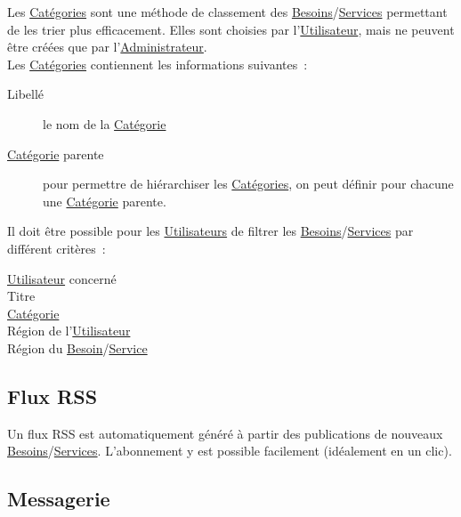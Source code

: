 \documentclass[french]{article}
\begin{document}
			Les \hyperlink{categorie}{Catégories} sont une méthode de classement des
			 \hyperlink{besoin}{Besoins}/\hyperlink{service}{Services} permettant de
			 les trier plus efficacement. Elles sont choisies par
			 l’\hyperlink{utilisateur}{Utilisateur}, mais ne peuvent être créées que
			 par l’\hyperlink{administrateur}{Administrateur}.\\
			
			Les \hyperlink{categorie}{Catégories} contiennent les informations
			suivantes :
			\begin{description}
				\item [Libellé]
					le nom de la \hyperlink{categorie}{Catégorie}
				\item [\hyperlink{categorie}{Catégorie} parente]
					pour permettre de hiérarchiser les \hyperlink{categorie}{Catégories},
					 on peut définir pour chacune une \hyperlink{categorie}{Catégorie}
					 parente.
			\end{description}
			
			Il doit être possible pour les \hyperlink{utilisateur}{Utilisateurs} de
			 filtrer les \hyperlink{besoin}{Besoins}/\hyperlink{service}{Services} par
			 différent critères :
			\begin{description}
				\item [\hyperlink{utilisateur}{Utilisateur} concerné]
				\item [Titre]
				\item [\hyperlink{categorie}{Catégorie}]
				\item [Région de l’\hyperlink{utilisateur}{Utilisateur}]
				\item [
					Région du \hyperlink{besoin}{Besoin}/\hyperlink{service}{Service}
				]
			\end{description}
			
		\newpage
		\subsection{Flux RSS}
			
			Un flux RSS est automatiquement généré à partir des publications de
			 nouveaux \hyperlink{besoin}{Besoins}/\hyperlink{service}{Services}.
			 L’abonnement y est possible facilement (idéalement en un clic).
			
		\subsection{Messagerie}
			
\end{document}

